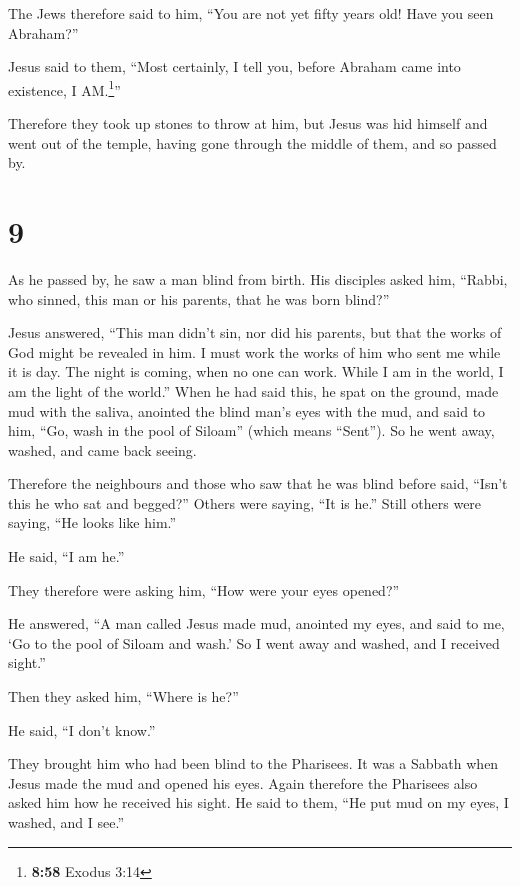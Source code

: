  The Jews therefore said to him, ``You are not yet fifty
years old! Have you seen Abraham?''

 Jesus said to them, ``Most certainly, I tell you, before
Abraham came into existence, I AM.\footnote{\textbf{8:58} Exodus 3:14}''

 Therefore they took up stones to throw at him, but Jesus
was hid himself and went out of the temple, having gone through the
middle of them, and so passed by.

\hypertarget{section-8}{%
\section{9}\label{section-8}}

 As he passed by, he saw a man blind from birth.
 His disciples asked him, ``Rabbi, who sinned, this man or
his parents, that he was born blind?''

 Jesus answered, ``This man didn't sin, nor did his
parents, but that the works of God might be revealed in him.
 I must work the works of him who sent me while it is day.
The night is coming, when no one can work.  While I am in
the world, I am the light of the world.''  When he had
said this, he spat on the ground, made mud with the saliva, anointed the
blind man's eyes with the mud,  and said to him, ``Go,
wash in the pool of Siloam'' (which means ``Sent''). So he went away,
washed, and came back seeing.

 Therefore the neighbours and those who saw that he was
blind before said, ``Isn't this he who sat and begged?'' 
Others were saying, ``It is he.'' Still others were saying, ``He looks
like him.''

He said, ``I am he.''

 They therefore were asking him, ``How were your eyes
opened?''

 He answered, ``A man called Jesus made mud, anointed my
eyes, and said to me, `Go to the pool of Siloam and wash.' So I went
away and washed, and I received sight.''

 Then they asked him, ``Where is he?''

He said, ``I don't know.''

 They brought him who had been blind to the Pharisees.
 It was a Sabbath when Jesus made the mud and opened his
eyes.  Again therefore the Pharisees also asked him how
he received his sight. He said to them, ``He put mud on my eyes, I
washed, and I see.''

